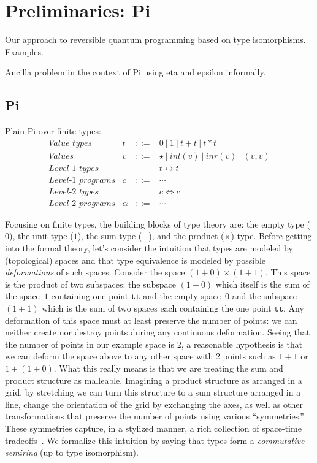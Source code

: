 \documentclass[sigplan,10pt,review,anonymous]{acmart}
\newcommand{\alt}{~|~}
\newcommand{\inlv}[1]{\ensuremath{\mathit{inl}(v)}}
\newcommand{\inrv}[1]{\ensuremath{\mathit{inr}(v)}}
\begin{document}
\section{Preliminaries: Pi}

Our approach to reversible quantum programming based on type
isomorphisms. Examples.

Ancilla problem in the context of Pi using eta and epsilon 
informally. 

\subsection{Pi}

Plain Pi over finite types:
\[\begin{array}{lrcl}
\textit{Value types} & t &::=& 0 \alt 1 \alt t+t \alt t*t \\
\textit{Values}      & v &::=& \star \alt \inlv{v} \alt \inrv{v} \alt (v,v) \\
\textit{Level-1 types} &&& t \leftrightarrow t \\
\textit{Level-1 programs} & c &::=& \cdots \\
\textit{Level-2 types} &&& c \Leftrightarrow c \\
\textit{Level-2 programs} & \alpha &::=& \cdots 
\end{array}\]

Focusing on finite types, the building blocks of type theory are: the
empty type ($0$), the unit type ($1$), the sum type ($+$), and the
product ($\times$) type. Before getting into the formal theory, let's
consider the intuition that types are modeled by (topological) spaces
and that type equivalence is modeled by possible \emph{deformations}
of such spaces. Consider the space $(1 + 0) \times (1 + 1)$. This
space is the product of two subspaces: the subspace $(1 + 0)$ which
itself is the sum of the space~$1$ containing one point $\texttt{tt}$
and the empty space~$0$ and the subspace $(1 + 1)$ which is the sum of
two spaces each containing the one point $\texttt{tt}$. Any
deformation of this space must at least preserve the number of points:
we can neither create nor destroy points during any continuous
deformation. Seeing that the number of points in our example space is
2, a reasonable hypothesis is that we can deform the space above to
any other space with 2 points such as $1 + 1$ or $1 + (1 + 0)$. What
this really means is that we are treating the sum and product
structure as malleable. Imagining a product structure as arranged in a
grid, by stretching we can turn this structure to a sum structure
arranged in a line, change the orientation of the grid by exchanging
the axes, as well as other transformations that preserve the number of
points using various ``symmetries.'' These symmetries capture, in a
stylized manner, a rich collection of space-time
tradeoffs~\cite{superstructural}. We formalize this intuition by
saying that types form a \emph{commutative semiring} (up to type
isomorphism).
\end{document}

